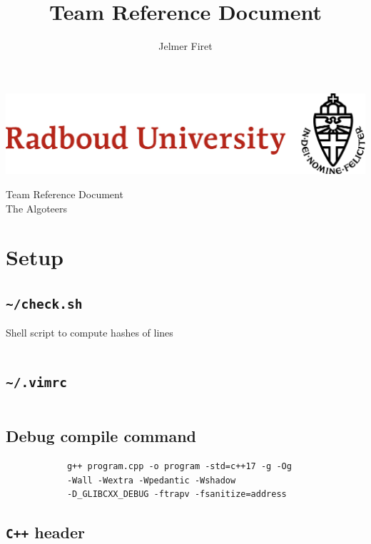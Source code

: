 \documentclass[11pt, a4paper]{amsart}
\title{Team Reference Document}
\author{Jelmer Firet}
\begin{document}
	\begin{center}
		\begin{minipage}[c]{0.45\textwidth}
			\includegraphics[width=\textwidth]{resouce/radboud_logo_full.jpg}
		\end{minipage}\;
		\begin{minipage}[c]{0.35\textwidth}
			\LARGE Team Reference Document\\
			\Large The Algoteers
		\end{minipage}
	\end{center}
	\begin{multicols}{2}
		\tableofcontents
		\columnbreak
		\vfill\null
	\end{multicols}
	\section{Setup} %
	\begin{multicols}{2}
		\subsection{\texttt{\textasciitilde/check.sh}}
		Shell script to compute hashes of lines
		\inputminted[lastline=3]{sh}{.code/setup/check.sh}
		\subsection{\texttt{\textasciitilde/.vimrc}}
		\inputminted[lastline=9]{sh}{.code/setup/vimrc.sh}
		\subsection{Debug compile command}
		\begin{verbatim}
			g++ program.cpp -o program -std=c++17 -g -Og
			-Wall -Wextra -Wpedantic -Wshadow
			-D_GLIBCXX_DEBUG -ftrapv -fsanitize=address
		\end{verbatim}
		\columnbreak
		\subsection{\texttt{C++} header}
		\inputminted[firstline=2,lastline=16]{cpp}{.code/setup/header.cpp}
	\end{multicols}
	\newpage
	\setcounter{page}{2}
\end{document}

